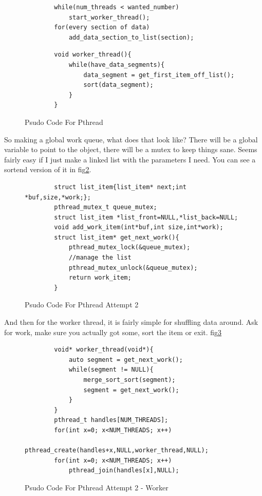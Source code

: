 \documentclass[12pt]{article}
\begin{document}
\begin{figure}[htb]
	\centering
	\begin{minipage}[t]{0.9\textwidth}
	\begin{verbatim}
		while(num_threads < wanted_number)
			start_worker_thread();
		for(every section of data)
			add_data_section_to_list(section);
	\end{verbatim}
	\end{minipage}
	\begin{minipage}[t]{0.9\textwidth}
	\begin{verbatim}
		void worker_thread(){
			while(have_data_segments){
				data_segment = get_first_item_off_list();
				sort(data_segment);
			}
		}
	\end{verbatim}
	\end{minipage}
	\caption{Psudo Code For Pthread}
	\label{pthread_psedo}
\end{figure}

So making a global work queue, what does that look like?
There will be a global variable to point to the object, there will be a mutex to keep things sane.
Seems fairly easy if I just make a linked list with the parameters I need.
You can see a sortend version of it in fig\ref{pthread_psedo_2}.

\begin{figure}[htb]
	\centering
	\begin{minipage}[t]{0.9\textwidth}
	\begin{verbatim}
		struct list_item{list_item* next;int *buf,size,*work;};
		pthread_mutex_t queue_mutex;
		struct list_item *list_front=NULL,*list_back=NULL;
		void add_work_item(int*buf,int size,int*work);
		struct list_item* get_next_work(){
			pthread_mutex_lock(&queue_mutex);
			//manage the list
			pthread_mutex_unlock(&queue_mutex);
			return work_item;
		}
	\end{verbatim}
	\end{minipage}
	\caption{Psudo Code For Pthread Attempt 2}
	\label{pthread_psedo_2}
\end{figure}

And then for the worker thread, it is fairly simple for shuffling data around.
Ask for work, make sure you actually got some, sort the item or exit. fig\ref{pthread_psedo_3}

\begin{figure}[htb]
	\centering
	\begin{minipage}[t]{0.9\textwidth}
	\begin{verbatim}
		void* worker_thread(void*){
			auto segment = get_next_work();
			while(segment != NULL){
				merge_sort_sort(segment);
				segment = get_next_work();
			}
		}
		pthread_t handles[NUM_THREADS];
		for(int x=0; x<NUM_THREADS; x++)
			pthread_create(handles+x,NULL,worker_thread,NULL);
		for(int x=0; x<NUM_THREADS; x++)
			pthread_join(handles[x],NULL);
	\end{verbatim}
	\end{minipage}
	\caption{Psudo Code For Pthread Attempt 2 - Worker}
	\label{pthread_psedo_3}
\end{figure}
\end{document}
